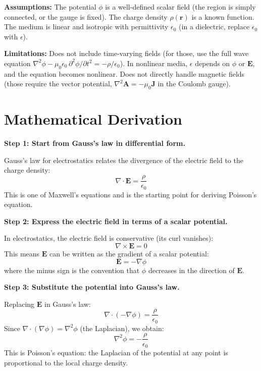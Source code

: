 \textbf{Assumptions:} The potential $\phi$ is a well-defined scalar field (the region is simply connected, or the gauge is fixed). The charge density $\rho(\mathbf{r})$ is a known function. The medium is linear and isotropic with permittivity $\epsilon_0$ (in a dielectric, replace $\epsilon_0$ with $\epsilon$).


\textbf{Limitations:} Does not include time-varying fields (for those, use the full wave equation $\nabla^2\phi - \mu_0\epsilon_0\,\partial^2\phi/\partial t^2 = -\rho/\epsilon_0$). In nonlinear media, $\epsilon$ depends on $\phi$ or $\mathbf{E}$, and the equation becomes nonlinear. Does not directly handle magnetic fields (those require the vector potential, $\nabla^2\mathbf{A} = -\mu_0\mathbf{J}$ in the Coulomb gauge).


\section*{Mathematical Derivation}

\textbf{Step 1: Start from Gauss's law in differential form.}

Gauss's law for electrostatics relates the divergence of the electric field to the charge density:
\begin{equation}
\nabla\cdot\mathbf{E} = \frac{\rho}{\epsilon_0}
\end{equation}
This is one of Maxwell's equations and is the starting point for deriving Poisson's equation.

\textbf{Step 2: Express the electric field in terms of a scalar potential.}

In electrostatics, the electric field is conservative (its curl vanishes):
\begin{equation}
\nabla\times\mathbf{E} = 0
\end{equation}
This means $\mathbf{E}$ can be written as the gradient of a scalar potential:
\begin{equation}
\mathbf{E} = -\nabla\phi
\end{equation}
where the minus sign is the convention that $\phi$ decreases in the direction of $\mathbf{E}$.

\textbf{Step 3: Substitute the potential into Gauss's law.}

Replacing $\mathbf{E}$ in Gauss's law:
\begin{equation}
\nabla\cdot(-\nabla\phi) = \frac{\rho}{\epsilon_0}
\end{equation}
Since $\nabla\cdot(\nabla\phi) = \nabla^2\phi$ (the Laplacian), we obtain:
\begin{equation}
\nabla^2\phi = -\frac{\rho}{\epsilon_0}
\end{equation}
This is Poisson's equation: the Laplacian of the potential at any point is proportional to the local charge density.

